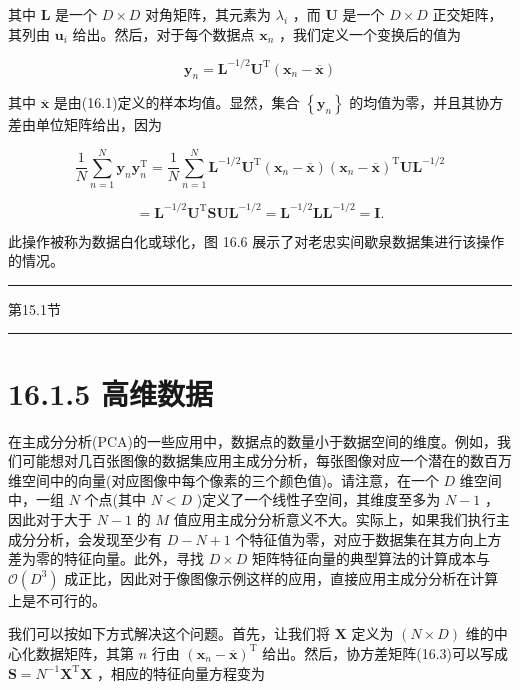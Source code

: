 \documentclass[10pt]{article}
\newcommand{\HRule}{\begin{center}\rule{0.9\linewidth}{0.2mm}\end{center}}
\begin{document}
其中 \(\mathbf{L}\) 是一个 \(D \times  D\) 对角矩阵，其元素为 \({\lambda }_{i}\) ，而 \(\mathbf{U}\) 是一个 \(D \times  D\) 正交矩阵，其列由 \({\mathbf{u}}_{i}\) 给出。然后，对于每个数据点 \({\mathbf{x}}_{n}\) ，我们定义一个变换后的值为

\[
{\mathbf{y}}_{n} = {\mathbf{L}}^{-1/2}{\mathbf{U}}^{\mathrm{T}}\left( {{\mathbf{x}}_{n} - \overline{\mathbf{x}}}\right)  \tag{16.24}
\]

其中 \(\overline{\mathbf{x}}\) 是由(16.1)定义的样本均值。显然，集合 \(\left\{  {\mathbf{y}}_{n}\right\}\) 的均值为零，并且其协方差由单位矩阵给出，因为

\[
\frac{1}{N}\mathop{\sum }\limits_{{n = 1}}^{N}{\mathbf{y}}_{n}{\mathbf{y}}_{n}^{\mathrm{T}} = \frac{1}{N}\mathop{\sum }\limits_{{n = 1}}^{N}{\mathbf{L}}^{-1/2}{\mathbf{U}}^{\mathrm{T}}\left( {{\mathbf{x}}_{n} - \overline{\mathbf{x}}}\right) {\left( {\mathbf{x}}_{n} - \overline{\mathbf{x}}\right) }^{\mathrm{T}}\mathbf{U}{\mathbf{L}}^{-1/2}
\]

\[
= {\mathbf{L}}^{-1/2}{\mathbf{U}}^{\mathrm{T}}\mathbf{S}\mathbf{U}{\mathbf{L}}^{-1/2} = {\mathbf{L}}^{-1/2}\mathbf{L}{\mathbf{L}}^{-1/2} = \mathbf{I}. \tag{16.25}
\]

此操作被称为数据白化或球化，图 16.6 展示了对老忠实间歇泉数据集进行该操作的情况。

\HRule

第15.1节

\HRule

\section*{16.1.5 高维数据}

在主成分分析(PCA)的一些应用中，数据点的数量小于数据空间的维度。例如，我们可能想对几百张图像的数据集应用主成分分析，每张图像对应一个潜在的数百万维空间中的向量(对应图像中每个像素的三个颜色值)。请注意，在一个 \(D\) 维空间中，一组 \(N\) 个点(其中 \(N < D\) )定义了一个线性子空间，其维度至多为 \(N - 1\) ，因此对于大于 \(N - 1\) 的 \(M\) 值应用主成分分析意义不大。实际上，如果我们执行主成分分析，会发现至少有 \(D - N + 1\) 个特征值为零，对应于数据集在其方向上方差为零的特征向量。此外，寻找 \(D \times  D\) 矩阵特征向量的典型算法的计算成本与 \(\mathcal{O}\left( {D}^{3}\right)\) 成正比，因此对于像图像示例这样的应用，直接应用主成分分析在计算上是不可行的。

我们可以按如下方式解决这个问题。首先，让我们将 \(\mathbf{X}\) 定义为 \(\left( {N \times  D}\right)\) 维的中心化数据矩阵，其第 \(n\) 行由 \({\left( {\mathbf{x}}_{n} - \overline{\mathbf{x}}\right) }^{\mathrm{T}}\) 给出。然后，协方差矩阵(16.3)可以写成 \(\mathbf{S} = {N}^{-1}{\mathbf{X}}^{\mathrm{T}}\mathbf{X}\) ，相应的特征向量方程变为
\end{document}

